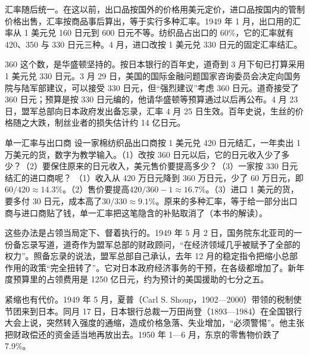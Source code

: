 汇率随后统一。在这以前，出口品按国外的价格用美元定价，进口品按国内的管制价格出售，汇率按商品事后算出，等于实行多种汇率\cite{mof2010}。1949 年 1 月，出口用的汇率从 1 美元兑 160 日元到 600 日元不等\cite{mof2010}。纺织品占出口的 60\%，它的汇率就有 420、350 与 330 日元三种\cite{mof2010}。4 月，进口改按 1 美元兑 330 日元的固定汇率结汇\cite{mof2010}。

360 这个数，是华盛顿坚持的。按日本银行的百年史，道奇到 3 月下旬已打算采用 1 美元兑 330 日元\cite{boj1985}。3 月 29 日，美国的国际金融问题国家咨询委员会决定向国务院与陆军部建议，可以接受 330 日元，但“强烈建议”考虑 360 日元\cite{boj1985}。道奇接受了 360 日元；预算是按 330 日元编的，他请华盛顿等预算通过以后再公布\cite{boj1985}。4 月 23 日，盟军总部向日本政府发出备忘录，汇率 4 月 25 日生效\cite{boj1985,mof2010,bojchron}。百年史说，生丝的价格随之大跌，制丝业者的损失估计约 14 亿日元\cite{boj1985}。

\begin{example}{单一汇率与出口商}\label{ex:reconstruction-yen}
设一家棉纺织品出口商按 1 美元兑 420 日元结汇，一年卖出 1 万美元的货，数字为教学输入。（1）改按 360 日元以后，它的日元收入少了多少？（2）要保住原来的日元收入，美元售价要提高多少？（3）一家按 330 日元结汇的进口商呢？
\solution
（1）收入从 420 万日元降到 360 万日元，少了 60 万日元，即$60/420\approx14.3\%$。（2）售价要提高$420/360-1\approx16.7\%$。（3）进口 1 美元的货，要多付 30 日元，成本高了$30/330\approx9.1\%$。原来的多种汇率，等于给一部分出口商与进口商贴了钱，单一汇率把这笔隐含的补贴取消了（本书的解读）。
\end{example}

这些办法是占领当局定下、督着执行的。1949 年 5 月 2 日，国务院东北亚司的一份备忘录写道，道奇作为盟军总部的财政顾问，“在经济领域几乎被赋予了全部的权力”\cite{frus1949jp}。照备忘录的说法，盟军总部自己承认，去年 12 月的稳定指令把缩小总部作用的政策“完全扭转了”\cite{frus1949jp}。它对日本政府经济事务的干预，在各级都增加了\cite{frus1949jp}。新年度预算里的占领费用是 1250 亿日元，约为预计的美国援助的七分之五\cite{frus1949jp}。

紧缩也有代价。1949 年 5 月，夏普（Carl S. Shoup，1902—2000）带领的税制使节团来到日本\cite{mof2010,loc35}。同月 17 日，日本银行总裁一万田尚登（1893—1984）在全国银行大会上说，突然转入强度的通缩，造成价格急落、失业增加，“必须警惕”\cite{boj1985,loc35}。他主张把财政偿还的资金适当地再放出去\cite{boj1985}。1950 年 1—6 月，东京的零售物价跌了 7.9\%\cite{boj1985}。

